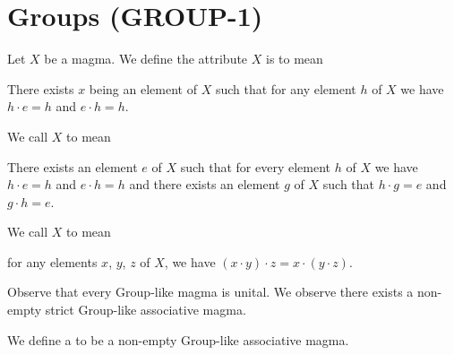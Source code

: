 \section{Groups (GROUP-1)}

\begin{definition}
Let $X$ be a magma. We define the attribute $X$ is  to
mean
\begin{defn}
\item There exists $x$ being an element of $X$ such that for any element
  $h$ of $X$ we have $h\cdot e=h$ and $e\cdot h=h$.
\end{defn}
We call $X$  to mean
\begin{defn}
\item There exists an element $e$ of $X$ such that for every element $h$
  of $X$ we have $h\cdot e=h$ and $e\cdot h=h$ and there exists an element $g$ of
  $X$ such that $h\cdot g=e$ and $g\cdot h=e$.
\end{defn}
We call $X$  to mean
\begin{defn}
\item for any elements $x$, $y$, $z$ of $X$, we have $(x\cdot y)\cdot z=x\cdot (y\cdot z)$.
\end{defn}
\end{definition}

Observe that every Group-like magma is unital. We observe there exists a
non-empty  strict Group-like associative magma.

\begin{definition}
We define a  to be a non-empty Group-like associative magma.
\end{definition}

